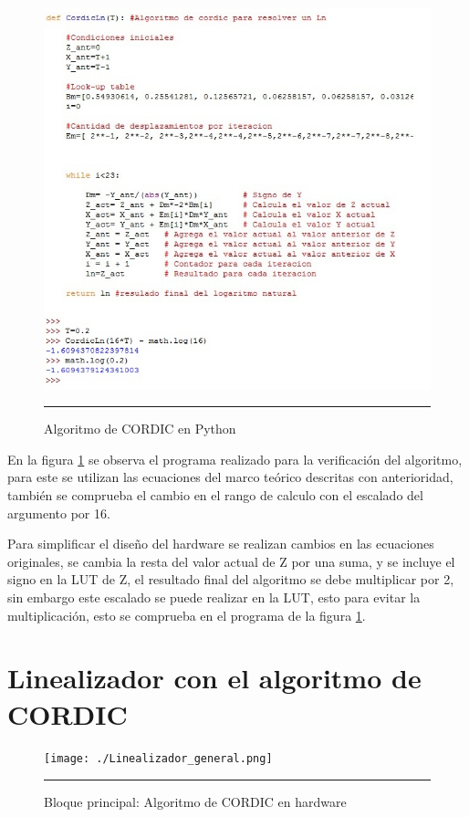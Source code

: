 \begin{figure}[H]
  \centering
    \includegraphics[scale=0.6]{./Progra_Cordic.jpg}
    \rule{35em}{0.5pt}
  \caption[Algoritmo de CORDIC en Python]{Algoritmo de CORDIC en Python  }
  \label{fig:Python}
\end{figure}


En la figura \ref{fig:Python} se observa el programa realizado para la verificación del algoritmo, para este se utilizan las ecuaciones del marco teórico descritas con anterioridad, también se comprueba el cambio en el rango de calculo con el escalado del argumento por 16. 

Para simplificar el diseño del hardware se realizan cambios en las ecuaciones originales, se cambia la resta del valor actual de Z por una suma, y se incluye el signo en la LUT de Z, el resultado final del algoritmo se debe multiplicar por 2, sin embargo este escalado se puede realizar en la LUT, esto para evitar la multiplicación, esto se comprueba en el programa de la figura \ref{fig:Python}.  


\section{Linealizador con el algoritmo de CORDIC}

\begin{figure}[H]
  \centering
    \texttt{[image: ./Linealizador\_general.png]}
    \rule{35em}{0.5pt}
  \caption[Bloque principal: algoritmo de CORDIC en hardware]{Bloque principal: Algoritmo de CORDIC en hardware  }
  \label{fig:CORDIC1}
\end{figure}

